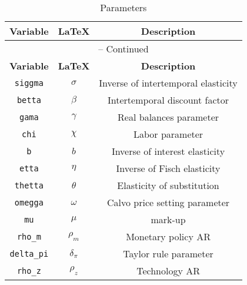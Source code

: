 \begin{center}
\begin{longtable}{ccc}
\caption{Parameters}\\%
\hline%
\multicolumn{1}{c}{\textbf{Variable}} &
\multicolumn{1}{c}{\textbf{\LaTeX}} &
\multicolumn{1}{c}{\textbf{Description}}\\%
\hline\hline%
\endfirsthead
\multicolumn{3}{c}{{\tablename} \thetable{} -- Continued}\\%
\hline%
\multicolumn{1}{c}{\textbf{Variable}} &
\multicolumn{1}{c}{\textbf{\LaTeX}} &
\multicolumn{1}{c}{\textbf{Description}}\\%
\hline\hline%
\endhead
\texttt{siggma} & $\sigma$ & Inverse of intertemporal elasticity\\
\texttt{betta} & $\beta$ & Intertemporal discount factor\\
\texttt{gama} & $\gamma$ & Real balances parameter\\
\texttt{chi} & $\chi$ & Labor parameter\\
\texttt{b} & $b$ & Inverse of interest elasticity\\
\texttt{etta} & $\eta$ & Inverse of Fisch elasticity\\
\texttt{thetta} & $\theta$ & Elasticity of substitution\\
\texttt{omegga} & $\omega$ & Calvo price setting parameter\\
\texttt{mu} & $\mu$ & mark-up\\
\texttt{rho\_m} & $\rho_{m}$ & Monetary policy AR\\
\texttt{delta\_pi} & $\delta_{\pi}$ & Taylor rule parameter\\
\texttt{rho\_z} & $\rho_z$ & Technology AR\\
\hline%
\end{longtable}
\end{center}
